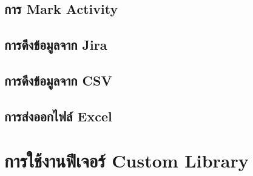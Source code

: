 \subsection{การ Mark Activity}
\subsection{การดึงข้อมูลจาก Jira}
\subsection{การดึงข้อมูลจาก CSV}
\subsection{การส่งออกไฟล์ Excel}

\newpage
\section{การใช้งานฟีเจอร์ Custom Library}

